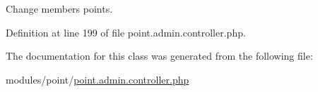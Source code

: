 Change members points. 



Definition at line 199 of file point.\-admin.\-controller.\-php.



The documentation for this class was generated from the following file\-:\begin{DoxyCompactItemize}
\item 
modules/point/\hyperlink{point_8admin_8controller_8php}{point.\-admin.\-controller.\-php}\end{DoxyCompactItemize}
